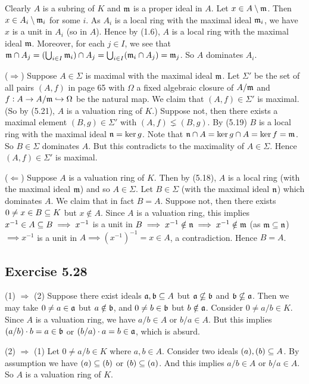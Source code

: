 \documentclass[../A&M.tex]{subfiles}
\begin{document}
Clearly $A$ is a subring of $K$ and $\mathfrak{m}$ is a proper ideal in $A$. Let $x\in A\setminus \mathfrak{m}$. Then $x\in A_i \setminus \mathfrak{m}_i$ for some $i$. As $A_i$ is a local ring with the maximal ideal $\mathfrak{m}_i$, we have $x$ is a unit in $A_i$ (so in $A$). Hence by (1.6), $A$ is a local ring with the maximal ideal $\mathfrak{m}$. Moreover, for each $j \in I$, we see that $\mathfrak{m} \cap A_j = (\bigcup_{i\in I} \mathfrak{m}_i) \cap A_j = \bigcup_{i\in I} (\mathfrak{m}_i \cap A_j) = \mathfrak{m}_j$. So $A$ dominates $A_i$.

($\Rightarrow$) Suppose $A \in \Sigma$ is maximal with the maximal ideal $\mathfrak{m}$. Let $\Sigma'$ be the set of all pairs $(A,f)$ in page 65 with $\Omega$ a fixed algebraic closure of $A/\mathfrak{m}$ and $f:A \to A/\mathfrak{m} \hookrightarrow \Omega$ be the natural map. We claim that $(A,f) \in \Sigma'$ is maximal. (So by (5.21), $A$ is a valuation ring of $K$.) Suppose not, then there exists a maximal element $(B,g) \in \Sigma'$ with $(A,f) \lneq (B,g)$. By (5.19) $B$ is a local ring with the maximal ideal $\mathfrak{n}=\ker g$. Note that $\mathfrak{n} \cap A = \ker g \cap A = \ker f = \mathfrak{m}$. So $B \in \Sigma$ dominates $A$. But this contradicts to the maximality of $A \in \Sigma$. Hence $(A,f) \in \Sigma'$ is maximal.

($\Leftarrow$) Suppose $A$ is a valuation ring of $K$. Then by (5.18), $A$ is a local ring (with the maximal ideal $\mathfrak{m}$) and so $A\in\Sigma$. Let $B\in\Sigma$ (with the maximal ideal $\mathfrak{n}$) which dominates $A$. We claim that in fact $B=A$. Suppose not, then there exists $0\neq x \in B \subseteq K$ but $x\notin A$. Since $A$ is a valuation ring, this implies $x^{-1}\in A \subseteq B \implies x^{-1}$ is a unit in $B \implies x^{-1} \notin \mathfrak{n} \implies x^{-1} \notin \mathfrak{m}$ (as $\mathfrak{m} \subseteq \mathfrak{n}$) $\implies x^{-1}$ is a unit in $A \implies (x^{-1})^{-1} = x \in A$, a contradiction. Hence $B=A$.

\subsection*{Exercise 5.28}

(1) $\Rightarrow$ (2) Suppose there exist ideals $\mathfrak{a},\mathfrak{b} \subseteq A$ but $\mathfrak{a} \nsubseteq \mathfrak{b}$ and $\mathfrak{b} \nsubseteq \mathfrak{a}$. Then we may take $0 \neq a \in \mathfrak{a}$ but $a \notin \mathfrak{b}$, and $0 \neq b \in \mathfrak{b}$ but $b \notin \mathfrak{a}$. Consider $0 \neq a/b \in K$. Since $A$ is a valuation ring, we have $a/b \in A$ or $b/a \in A$. But this implies $(a/b) \cdot b = a \in \mathfrak{b}$ or $(b/a) \cdot a = b \in \mathfrak{a}$, which is absurd.

(2) $\Rightarrow$ (1) Let $0 \neq a/b \in K$ where $a,b\in A$. Consider two ideals $(a),(b) \subseteq A$. By assumption we have $(a) \subseteq (b)$ or $(b) \subseteq (a)$. And this implies $a/b \in A$ or $b/a \in A$. So $A$ is a valuation ring of $K$. 
\end{document}
